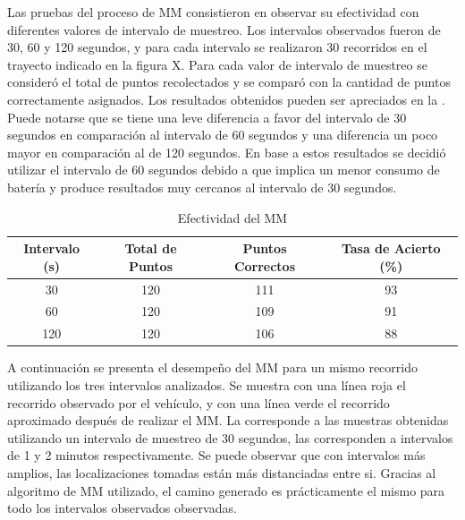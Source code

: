 
Las pruebas del proceso de MM consistieron en observar su efectividad con diferentes valores de intervalo de muestreo. Los intervalos observados fueron de 30, 60 y 120 segundos, y para cada intervalo se realizaron 30 recorridos en el trayecto indicado en la figura X. Para cada valor de intervalo de muestreo se consideró el total de puntos recolectados y se comparó con la cantidad de puntos correctamente asignados. Los resultados obtenidos pueden ser apreciados en la . Puede notarse que se tiene una leve diferencia a favor del intervalo de 30 segundos en comparación al intervalo de 60 segundos y una diferencia un poco mayor en comparación al de 120 segundos. En base a estos resultados se decidió utilizar el intervalo de 60 segundos debido a que implica un menor consumo de batería y produce resultados muy cercanos al intervalo de 30 segundos.

\begin{table}[h]
	\centering
	\begin{tabular}{cccc}
        \toprule
    	Intervalo (s) & Total de Puntos & Puntos Correctos & Tasa de Acierto (\%)\\
    	\midrule
    	30 & 120  & 111 & 93 \\
    	60 & 120 & 109 & 91 \\
    	120 & 120 & 106 & 88 \\ 
    	\bottomrule
	\end{tabular}
	\caption{Efectividad del MM} 
	\label{table:map_matching}
\end{table}

A continuación se presenta el desempeño del MM para un mismo recorrido utilizando los tres intervalos analizados. Se muestra con una línea roja el recorrido observado por el vehículo, y con una línea verde el recorrido aproximado después de realizar el MM. La  corresponde a las muestras obtenidas utilizando un intervalo de muestreo de 30 segundos, las  corresponden a intervalos de 1 y 2 minutos respectivamente. Se puede observar que con intervalos más amplios, las localizaciones tomadas están más distanciadas entre si. Gracias al algoritmo de MM utilizado, el camino generado es prácticamente el mismo para todo los intervalos observados observadas.

